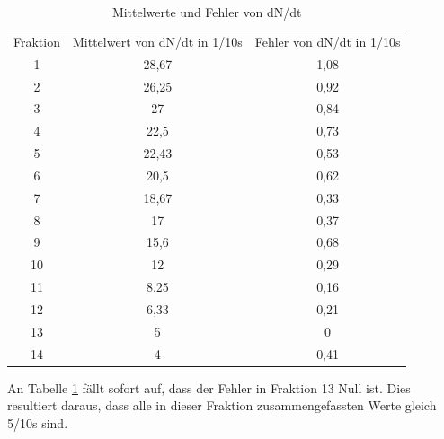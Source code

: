 \begin{table}
\begin{tabular}{|c|c|c|}


Fraktion	&Mittelwert von dN/dt in 1/10s	&Fehler von dN/dt in 1/10s \\

1		&28,67				&1,08\\

2		&26,25				&0,92\\

3		&27					&0,84\\

4		&22,5				&0,73\\

5		&22,43				&0,53\\

6		&20,5				&0,62\\

7		&18,67				&0,33\\

8		&17					&0,37\\

9		&15,6				&0,68\\

10		&12					&0,29\\

11		&8,25				&0,16\\

12		&6,33				&0,21\\

13		&5					&0\\

14		&4					&0,41\\

\end{tabular}
\caption{Mittelwerte und Fehler von dN/dt}
\label{tbl_3}
\end{table}


An Tabelle \ref{tbl_3} fällt sofort auf, dass der Fehler in Fraktion 13 Null ist. Dies resultiert daraus, dass alle in dieser Fraktion zusammengefassten Werte gleich 5/10s sind.


